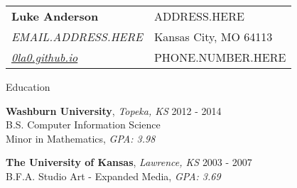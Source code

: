 \documentclass{structure} %
\begin{document}

\begin{center}
\begin{tabular}{ll}
  {\huge {\bf Luke Anderson}} & ADDRESS.HERE\\
  {\it EMAIL.ADDRESS.HERE} & Kansas City, MO 64113\\
  {\it \href{http://0la0.github.io}{0la0.github.io}} & PHONE.NUMBER.HERE
\end{tabular}
\end{center}


\begin{rSection}{Education}

{\bf Washburn University}, {\it Topeka, KS} \hfill { 2012 - 2014} \\
B.S. Computer Information Science \\
Minor in Mathematics, {\it GPA: 3.98}

{\bf The University of Kansas}, {\it Lawrence, KS} \hfill { 2003 - 2007} \\
B.F.A. Studio Art - Expanded Media, {\it GPA: 3.69}

\end{rSection}

\end{document}
